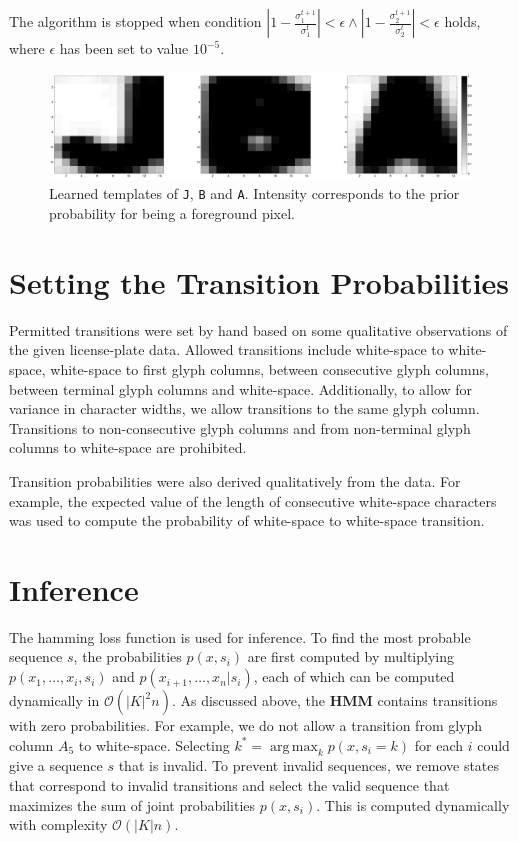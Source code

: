 \documentclass[a4paper,12pt]{article}
\DeclareMathOperator*{\argmax}{arg\,max}
\begin{document}
The algorithm is stopped when condition $|1-\frac{\sigma_1^{t+1}}{\sigma_1^{t}}| < \epsilon \wedge |1-\frac{\sigma_2^{t+1}}{\sigma_2^{t}}| < \epsilon$ holds, where $\epsilon$ has been set to value $10^{-5}$.


\begin{figure}[htp]
\centering
\includegraphics[width=\linewidth]{pics/jba.png}
\caption{Learned templates of \texttt{J}, \texttt{B} and
  \texttt{A}. Intensity corresponds to the prior probability for being
  a foreground pixel.}
\label{fig:templates}
\end{figure}

\section{Setting the Transition Probabilities}
Permitted transitions were set by hand based on some qualitative
observations of the given license-plate data. Allowed transitions
include white-space to white-space, white-space to first glyph
columns, between consecutive glyph columns, between terminal glyph
columns and white-space. Additionally, to allow for variance in
character widths, we allow transitions to the same glyph
column. Transitions to non-consecutive glyph columns and from
non-terminal glyph columns to white-space are prohibited.

Transition probabilities were also derived qualitatively from the
data. For example, the expected value of the length of consecutive
white-space characters was used to compute the probability of
white-space to white-space transition.

\section{Inference}
The hamming loss function is used for inference.  To find the most
probable sequence $s$, the probabilities $p(x,s_i)$ are first computed
by multiplying $p(x_1,\ldots,x_i,s_i)$ and
$p(x_{i+1},\ldots,x_n|s_i)$, each of which can be computed dynamically
in $\mathcal{O}(|K|^2n)$. As discussed above, the \textbf{HMM}
contains transitions with zero probabilities. For example, we do not
allow a transition from glyph column $A_5$ to white-space. Selecting
$k^*=\argmax_k{p(x,s_i=k)}$ for each $i$ could give a sequence $s$
that is invalid. To prevent invalid sequences, we remove states that
correspond to invalid transitions and select the valid sequence that
maximizes the sum of joint probabilities $p(x,s_i)$. This is computed
dynamically with complexity $\mathcal{O}(|K|n)$.
\end{document}
